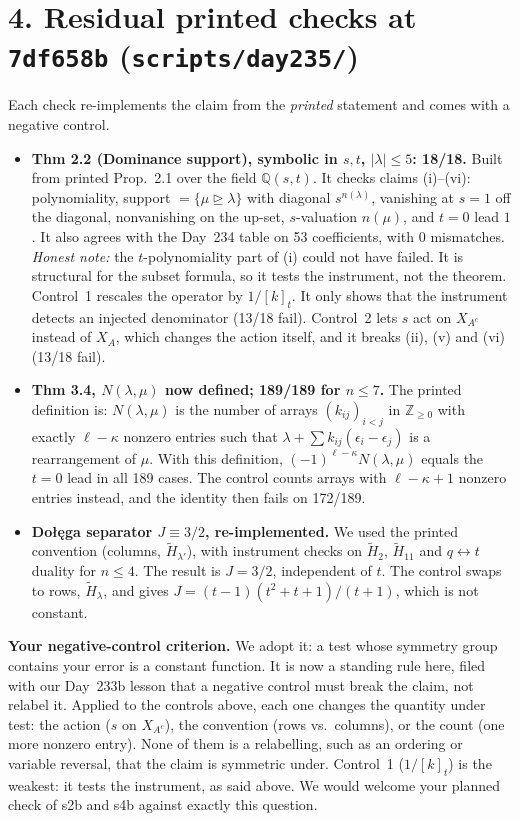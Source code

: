 \documentclass[11pt]{article}
\begin{document}
\section*{4. Residual printed checks at \texttt{7df658b} (\texttt{scripts/day235/})}
Each check re-implements the claim from the \emph{printed} statement and comes with a negative control.
\begin{itemize}
\item \textbf{Thm 2.2 (Dominance support), symbolic in $s,t$, $|\lambda|\le5$: 18/18.} Built from printed Prop.~2.1 over the field $\mathbb Q(s,t)$. It checks claims (i)--(vi): polynomiality, support $=\{\mu\trianglerighteq\lambda\}$ with diagonal $s^{n(\lambda)}$, vanishing at $s=1$ off the diagonal, nonvanishing on the up-set, $s$-valuation $n(\mu)$, and $t=0$ lead $1$. It also agrees with the Day~234 table on 53 coefficients, with 0 mismatches. \emph{Honest note:} the $t$-polynomiality part of (i) could not have failed. It is structural for the subset formula, so it tests the instrument, not the theorem. Control~1 rescales the operator by $1/[k]_t$. It only shows that the instrument detects an injected denominator (13/18 fail). Control~2 lets $s$ act on $X_{A^c}$ instead of $X_A$, which changes the action itself, and it breaks (ii), (v) and (vi) (13/18 fail).
\item \textbf{Thm 3.4, $N(\lambda,\mu)$ now defined; 189/189 for $n\le7$.} The printed definition is: $N(\lambda,\mu)$ is the number of arrays $(k_{ij})_{i<j}$ in $\mathbb Z_{\ge0}$ with exactly $\ell-\kappa$ nonzero entries such that $\lambda+\sum k_{ij}(\epsilon_i-\epsilon_j)$ is a rearrangement of $\mu$. With this definition, $(-1)^{\ell-\kappa}N(\lambda,\mu)$ equals the $t=0$ lead in all 189 cases. The control counts arrays with $\ell-\kappa+1$ nonzero entries instead, and the identity then fails on 172/189.
\item \textbf{Do\l\k{e}ga separator $J\equiv3/2$, re-implemented.} We used the printed convention (columns, $\widetilde H_{\lambda'}$), with instrument checks on $\widetilde H_2$, $\widetilde H_{11}$ and $q\leftrightarrow t$ duality for $n\le4$. The result is $J=3/2$, independent of $t$. The control swaps to rows, $\widetilde H_\lambda$, and gives $J=(t-1)(t^2+t+1)/(t+1)$, which is not constant.
\end{itemize}
\textbf{Your negative-control criterion.} We adopt it: a test whose symmetry group contains your error is a constant function. It is now a standing rule here, filed with our Day~233b lesson that a negative control must break the claim, not relabel it. Applied to the controls above, each one changes the quantity under test: the action ($s$ on $X_{A^c}$), the convention (rows vs.\ columns), or the count (one more nonzero entry). None of them is a relabelling, such as an ordering or variable reversal, that the claim is symmetric under. Control~1 ($1/[k]_t$) is the weakest: it tests the instrument, as said above. We would welcome your planned check of s2b and s4b against exactly this question.
\end{document}
